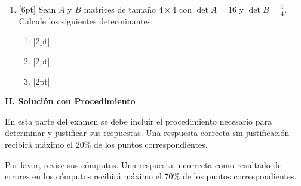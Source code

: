 \documentclass[11pt]{article}
\begin{document}
\begin{enumerate}
\vspace{4pt}

\item{}[6pt] Sean $A$ y $B$ matrices de tamaño $4\times 4$ con $\det A = 16$ y $\det B = \frac{1}{4}$. Calcule los siguientes determinantes:
\begin{enumerate}
\item{}[2pt]

\vspace{4pt}

\item{}[2pt]

\vspace{4pt}

\item{}[2pt]

\vspace{4pt}
\end{enumerate}
\end{enumerate}

\newpage
\noindent\textbf{\large II. Solución con Procedimiento}

\vspace{6pt}
\noindent En esta parte del examen se debe incluir el procedimiento necesario para determinar y justificar sus respuestas. Una respuesta correcta sin justificación recibirá máximo el 20\% de los puntos correspondientes.

\vspace{4pt}
\noindent Por favor, revise sus cómputos. Una respuesta incorrecta como resultado de errores en los cómputos recibirá máximo el 70\% de los puntos correspondientes.
\end{document}
